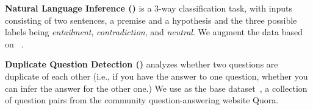 \textbf{Natural Language Inference (\nli)} is a 3-way classification task, with inputs consisting of two sentences, a premise and a hypothesis and the three possible labels being \emph{entailment}, \emph{contradiction}, and \emph{neutral}.
We augment the data based on \dnli~\cite{bowman-etal-2015-large}. 
 
\textbf{Duplicate Question Detection (\qqp)} analyzes whether two questions are duplicate of each other (i.e., if you have the answer to one question, whether you can infer the answer for the other one.) 
We use \dqqp as the base dataset~\cite{wang2018glue}, a collection of question pairs from the community question-answering website Quora.

